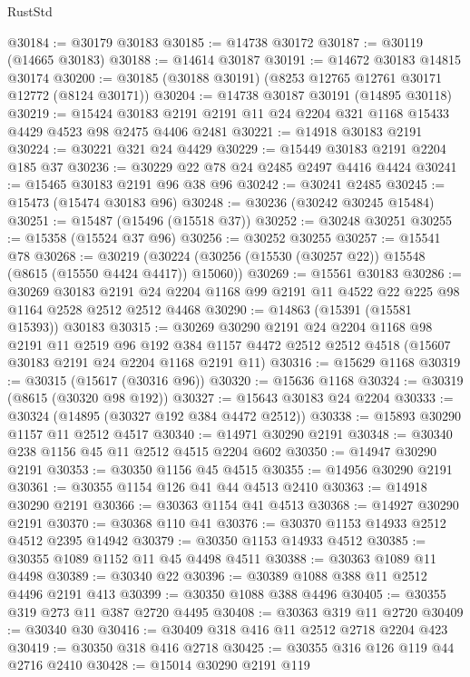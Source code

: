 \begin{lexlean}{RustStd}
\begin{coremodule}
@30184 := @30179 @30183
@30185 := @14738 @30172
@30187 := @30119 (@14665 @30183)
@30188 := @14614 @30187
@30191 := @14672 @30183 @14815 @30174
@30200 := @30185 (@30188 @30191) (@8253 @12765 @12761 @30171 @12772 (@8124 @30171))
@30204 := @14738 @30187 @30191 (@14895 @30118)
@30219 := @15424
    @30183
    @2191
    @2191
    @11
    @24
    @2204
    @321
    @1168
    @15433
    @4429
    @4523
    @98
    @2475
    @4406
    @2481
@30221 := @14918 @30183 @2191
@30224 := @30221 @321 @24 @4429
@30229 := @15449 @30183 @2191 @2204 @185 @37
@30236 := @30229 @22 @78 @24 @2485 @2497 @4416 @4424
@30241 := @15465 @30183 @2191 @96 @38 @96
@30242 := @30241 @2485
@30245 := @15473 (@15474 @30183 @96)
@30248 := @30236 (@30242 @30245 @15484)
@30251 := @15487 (@15496 (@15518 @37))
@30252 := @30248 @30251
@30255 := @15358 (@15524 @37 @96)
@30256 := @30252 @30255
@30257 := @15541 @78
@30268 := @30219 (@30224 (@30256 (@15530 (@30257 @22)) @15548 (@8615 (@15550 @4424 @4417)) @15060))
@30269 := @15561 @30183
@30286 := @30269
    @30183
    @2191
    @24
    @2204
    @1168
    @99
    @2191
    @11
    @4522
    @22
    @225
    @98
    @1164
    @2528
    @2512
    @2512
    @4468
@30290 := @14863 (@15391 (@15581 @15393)) @30183
@30315 := @30269
    @30290
    @2191
    @24
    @2204
    @1168
    @98
    @2191
    @11
    @2519
    @96
    @192
    @384
    @1157
    @4472
    @2512
    @2512
    @4518
    (@15607 @30183 @2191 @24 @2204 @1168 @2191 @11)
@30316 := @15629 @1168
@30319 := @30315 (@15617 (@30316 @96))
@30320 := @15636 @1168
@30324 := @30319 (@8615 (@30320 @98 @192))
@30327 := @15643 @30183 @24 @2204
@30333 := @30324 (@14895 (@30327 @192 @384 @4472 @2512))
@30338 := @15893 @30290 @1157 @11 @2512 @4517
@30340 := @14971 @30290 @2191
@30348 := @30340 @238 @1156 @45 @11 @2512 @4515 @2204 @602
@30350 := @14947 @30290 @2191
@30353 := @30350 @1156 @45 @4515
@30355 := @14956 @30290 @2191
@30361 := @30355 @1154 @126 @41 @44 @4513 @2410
@30363 := @14918 @30290 @2191
@30366 := @30363 @1154 @41 @4513
@30368 := @14927 @30290 @2191
@30370 := @30368 @110 @41
@30376 := @30370 @1153 @14933 @2512 @4512 @2395 @14942
@30379 := @30350 @1153 @14933 @4512
@30385 := @30355 @1089 @1152 @11 @45 @4498 @4511
@30388 := @30363 @1089 @11 @4498
@30389 := @30340 @22
@30396 := @30389 @1088 @388 @11 @2512 @4496 @2191 @413
@30399 := @30350 @1088 @388 @4496
@30405 := @30355 @319 @273 @11 @387 @2720 @4495
@30408 := @30363 @319 @11 @2720
@30409 := @30340 @30
@30416 := @30409 @318 @416 @11 @2512 @2718 @2204 @423
@30419 := @30350 @318 @416 @2718
@30425 := @30355 @316 @126 @119 @44 @2716 @2410
@30428 := @15014 @30290 @2191 @119

\end{coremodule}
\end{lexlean}
